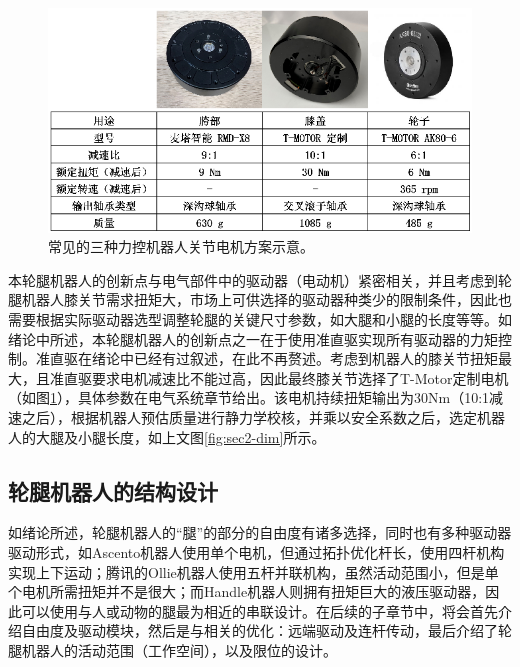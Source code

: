 \begin{figure}
  \centering
  \includegraphics[width=0.9\linewidth]{figures/Sec2/motors.png}
  \caption{
  常见的三种力控机器人关节电机方案示意。
  }
  \label{fig:sec2-motors}
   \vspace{6pt}
\end{figure}

本轮腿机器人的创新点与电气部件中的驱动器（电动机）紧密相关，并且考虑到轮腿机器人膝关节需求扭矩大，市场上可供选择的驱动器种类少的限制条件，因此也需要根据实际驱动器选型调整轮腿的关键尺寸参数，如大腿和小腿的长度等等。如绪论中所述，本轮腿机器人的创新点之一在于使用准直驱实现所有驱动器的力矩控制。准直驱在绪论中已经有过叙述，在此不再赘述。考虑到机器人的膝关节扭矩最大，且准直驱要求电机减速比不能过高，因此最终膝关节选择了T-Motor定制电机（如图\ref{fig:sec2-motors}），具体参数在电气系统章节给出。该电机持续扭矩输出为30Nm（10:1减速之后），根据机器人预估质量进行静力学校核，并乘以安全系数之后，选定机器人的大腿及小腿长度，如上文图\ref{fig:sec2-dim}所示。


\subsection{轮腿机器人的结构设计}
如绪论所述，轮腿机器人的“腿”的部分的自由度有诸多选择，同时也有多种驱动器驱动形式，如Ascento机器人使用单个电机，但通过拓扑优化杆长，使用四杆机构实现上下运动；腾讯的Ollie机器人使用五杆并联机构，虽然活动范围小，但是单个电机所需扭矩并不是很大；而Handle机器人则拥有扭矩巨大的液压驱动器，因此可以使用与人或动物的腿最为相近的串联设计。在后续的子章节中，将会首先介绍自由度及驱动模块，然后是与相关的优化：远端驱动及连杆传动，最后介绍了轮腿机器人的活动范围（工作空间），以及限位的设计。


